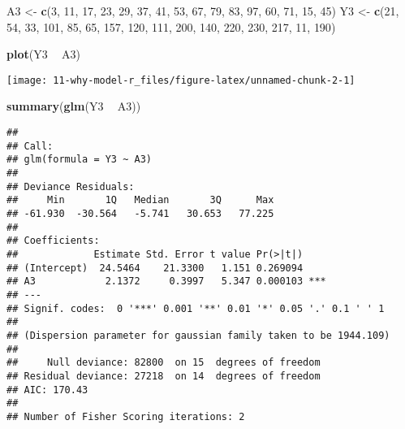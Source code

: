 \documentclass[
  10pt,
]{book}
\newenvironment{Shaded}{\begin{snugshade}}{\end{snugshade}}
\newcommand{\DecValTok}[1]{\textcolor[rgb]{0.00,0.00,0.81}{#1}}
\newcommand{\KeywordTok}[1]{\textcolor[rgb]{0.13,0.29,0.53}{\textbf{#1}}}
\newcommand{\NormalTok}[1]{#1}
\newcommand{\OperatorTok}[1]{\textcolor[rgb]{0.81,0.36,0.00}{\textbf{#1}}}
\newcommand{\StringTok}[1]{\textcolor[rgb]{0.31,0.60,0.02}{#1}}
\begin{document}
\begin{Shaded}
\begin{Highlighting}[]
\NormalTok{A3 <-}
\StringTok{  }\KeywordTok{c}\NormalTok{(}\DecValTok{3}\NormalTok{, }\DecValTok{11}\NormalTok{, }\DecValTok{17}\NormalTok{, }\DecValTok{23}\NormalTok{, }\DecValTok{29}\NormalTok{, }\DecValTok{37}\NormalTok{, }\DecValTok{41}\NormalTok{, }\DecValTok{53}\NormalTok{, }\DecValTok{67}\NormalTok{, }\DecValTok{79}\NormalTok{, }\DecValTok{83}\NormalTok{, }\DecValTok{97}\NormalTok{, }\DecValTok{60}\NormalTok{, }\DecValTok{71}\NormalTok{, }\DecValTok{15}\NormalTok{, }\DecValTok{45}\NormalTok{)}
\NormalTok{Y3 <-}
\StringTok{  }\KeywordTok{c}\NormalTok{(}\DecValTok{21}\NormalTok{, }\DecValTok{54}\NormalTok{, }\DecValTok{33}\NormalTok{, }\DecValTok{101}\NormalTok{, }\DecValTok{85}\NormalTok{, }\DecValTok{65}\NormalTok{, }\DecValTok{157}\NormalTok{, }\DecValTok{120}\NormalTok{, }\DecValTok{111}\NormalTok{, }\DecValTok{200}\NormalTok{, }\DecValTok{140}\NormalTok{, }\DecValTok{220}\NormalTok{, }\DecValTok{230}\NormalTok{, }\DecValTok{217}\NormalTok{,}
    \DecValTok{11}\NormalTok{, }\DecValTok{190}\NormalTok{)}

\KeywordTok{plot}\NormalTok{(Y3 }\OperatorTok{~}\StringTok{ }\NormalTok{A3)}
\end{Highlighting}
\end{Shaded}

\begin{center}\texttt{[image: 11-why-model-r\_files/figure-latex/unnamed-chunk-2-1]} \end{center}

\begin{Shaded}
\begin{Highlighting}[]
\KeywordTok{summary}\NormalTok{(}\KeywordTok{glm}\NormalTok{(Y3 }\OperatorTok{~}\StringTok{ }\NormalTok{A3))}
\end{Highlighting}
\end{Shaded}

\begin{verbatim}
## 
## Call:
## glm(formula = Y3 ~ A3)
## 
## Deviance Residuals: 
##     Min       1Q   Median       3Q      Max  
## -61.930  -30.564   -5.741   30.653   77.225  
## 
## Coefficients:
##             Estimate Std. Error t value Pr(>|t|)    
## (Intercept)  24.5464    21.3300   1.151 0.269094    
## A3            2.1372     0.3997   5.347 0.000103 ***
## ---
## Signif. codes:  0 '***' 0.001 '**' 0.01 '*' 0.05 '.' 0.1 ' ' 1
## 
## (Dispersion parameter for gaussian family taken to be 1944.109)
## 
##     Null deviance: 82800  on 15  degrees of freedom
## Residual deviance: 27218  on 14  degrees of freedom
## AIC: 170.43
## 
## Number of Fisher Scoring iterations: 2
\end{verbatim}
\end{document}
